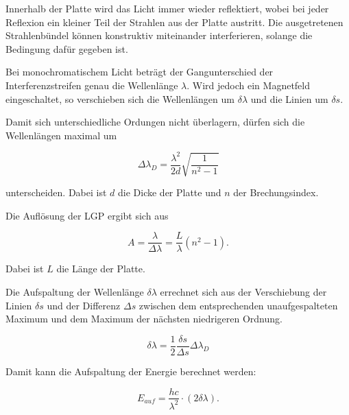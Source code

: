 Innerhalb der Platte wird das Licht immer wieder reflektiert, wobei bei jeder Reflexion ein kleiner Teil der Strahlen
aus der Platte austritt. Die ausgetretenen Strahlenbündel können konstruktiv miteinander interferieren, solange die Bedingung
dafür gegeben ist.

Bei monochromatischem Licht beträgt der Gangunterschied der Interferenzstreifen genau die Wellenlänge $\lambda$. Wird
jedoch ein Magnetfeld eingeschaltet, so verschieben sich die Wellenlängen um $\delta \lambda$ und die Linien um
$\delta s$.

Damit sich unterschiedliche Ordungen nicht überlagern, dürfen sich die Wellenlängen maximal um

\begin{equation}
  \Delta\lambda_{D} = \frac{\lambda^2}{2d} \sqrt{\frac{1}{n^2-1}}
  \label{eqn:delta_lambda}
\end{equation}

unterscheiden. Dabei ist $d$ die Dicke der Platte und $n$ der Brechungsindex.

Die Auflösung der LGP ergibt sich aus

\begin{equation}
  A = \frac{\lambda}{\Delta\lambda} = \frac{L}{\lambda} \left(n^2-1\right) .
\end{equation}

Dabei ist $L$ die Länge der Platte.

Die Aufspaltung der Wellenlänge $\delta \lambda$ errechnet sich aus der Verschiebung der Linien $\delta s$ und der
Differenz $\Delta s$ zwischen dem entsprechenden unaufgespalteten Maximum und dem Maximum der nächsten niedrigeren Ordnung.

\begin{equation}
	\delta \lambda = \frac{1}{2} \frac{\delta s}{\Delta s} \Delta\lambda_{D}
	\label{eqn:del_lambda}
\end{equation}

Damit kann die Aufspaltung der Energie berechnet werden:

\begin{equation}
	E_{auf} = \frac{h c}{\lambda^2} \cdot (2 \delta \lambda) .
	\label{eqn:E_auf}
\end{equation}
